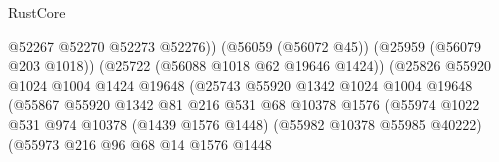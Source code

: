 \begin{lexlean}{RustCore}
\begin{coremodule}
                                                    @52267
                                                    @52270
                                                    @52273
                                                    @52276))
                                                (@56059 (@56072 @45))
                                                (@25959 (@56079 @203 @1018))
                                                (@25722 (@56088 @1018 @62 @19646 @1424))
                                                (@25826
                                                  @55920
                                                  @1024
                                                  @1004
                                                  @1424
                                                  @19648
                                                  (@25743
                                                    @55920
                                                    @1342
                                                    @1024
                                                    @1004
                                                    @19648
                                                    (@55867
                                                      @55920
                                                      @1342
                                                      @81
                                                      @216
                                                      @531
                                                      @68
                                                      @10378
                                                      @1576
                                                      (@55974
                                                        @1022
                                                        @531
                                                        @974
                                                        @10378
                                                        (@1439 @1576 @1448)
                                                        (@55982 @10378 @55985 @40222)
                                                        (@55973
                                                          @216
                                                          @96
                                                          @68
                                                          @14
                                                          @1576
                                                          @1448

\end{coremodule}
\end{lexlean}
